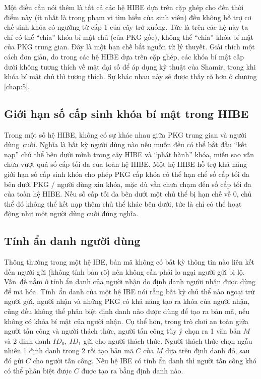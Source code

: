 \documentclass[class=report, crop=false]{standalone}
\begin{document}
			Một điều cần nói thêm là tất cả các hệ HIBE dựa trên cặp ghép cho đến thời điểm này (ít nhất là trong phạm vi tìm hiểu của sinh viên) đều không hỗ trợ cơ chế sinh khóa có ngưỡng từ cấp 1 của cây trở xuống. Tức là trên các hệ này ta chỉ có thể ``chia'' khóa bí mật chủ (của PKG gốc), không thể ``chia'' khóa bí mật của PKG trung gian. Đây là một hạn chế bắt nguồn từ lý thuyết. Giải thích một cách đơn giản, do trong các hệ HIBE dựa trên cặp ghép, các khóa bí mật cấp dưới không tương thích về mặt đại số để áp dụng kỹ thuật của Shamir, trong khi khóa bí mật chủ thì tương thích. Sự khác nhau này sẽ được thấy rõ hơn ở chương \ref{chap:5}.
		\subsection{Giới hạn số cấp sinh khóa bí mật trong HIBE}\label{chap2:sec4:restrict_key_derivation}
			Trong một số hệ HIBE, không có sự khác nhau giữa PKG trung gian và người dùng~cuối. Nghĩa là bất kỳ người dùng nào nếu muốn đều có thể bắt đầu ``kết nạp'' chủ thể bên dưới mình trong cây HIBE và ``phát hành'' khóa, miễn sao vẫn chưa vượt quá số cấp tối đa của toàn hệ HIBE. Một hệ HIBE hỗ trợ khả năng giới hạn số cấp sinh khóa cho phép PKG cấp khóa có thể hạn chế số cấp tối đa bên dưới PKG / người dùng xin khóa, mặc dù vẫn chưa chạm đến số cấp tối đa của toàn hệ HIBE. Nếu số cấp tối đa bên dưới một chủ thể bị hạn chế về $0$, chủ thể đó không thể kết nạp thêm chủ thể khác bên dưới, tức là chỉ có thể hoạt động như một người dùng cuối đúng nghĩa.
		\subsection{Tính ẩn danh người dùng}
			Thông thường trong một hệ IBE, bản mã không có bất kỳ thông tin nào liên kết đến người gửi (không tính bản rõ) nên không cần phải lo ngại người gửi bị lộ. Vấn~đề nằm ở tính ẩn danh của người nhận do định danh người nhận được dùng để mã hóa. Tính~ẩn danh của một hệ IBE nói rằng bất kỳ chủ thể nào ngoại trừ người gửi, người nhận và những PKG có khả năng tạo ra khóa của người nhận, cũng đều không thể phân biệt định danh nào được dùng để tạo ra bản mã, nếu không có khóa bí mật của người nhận. Cụ thể hơn, trong trò chơi an toàn giữa người tấn công và người thách thức, người tấn công tùy ý chọn ra 1 văn bản $M$ và 2 định danh $ID_0,\ ID_1$ gửi cho người thách thức. Người thách thức chọn ngẫu nhiên 1 định danh trong 2 rồi tạo bản mã $C$ của $M$ dựa trên định danh đó, sau đó gửi $C$ cho người tấn công. Nếu hệ IBE có tính ẩn danh thì người tấn công khó có thể phân biệt được $C$ được tạo ra bằng định danh nào.
\end{document}
